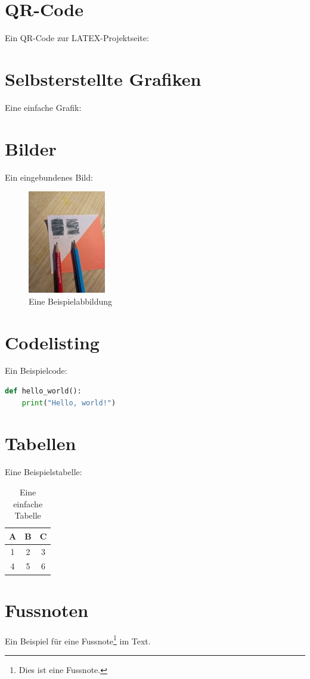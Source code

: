 \documentclass[a4paper,12pt]{article}
\begin{document}
\section{QR-Code}
Ein QR-Code zur LATEX-Projektseite:

\section{Selbsterstellte Grafiken}
Eine einfache Grafik:

\section{Bilder}
Ein eingebundenes Bild:
\begin{figure}[h!]
\centering
\includegraphics{Bild1}
\caption{Eine Beispielabbildung}
\label{fig:beispiel}
\end{figure}

\section{Codelisting}
Ein Beispielcode:
\begin{lstlisting}[language=Python, caption={Beispielcode in Python}]
def hello_world():
    print("Hello, world!")
\end{lstlisting}

\section{Tabellen}
\label{sec:tabellen}
Eine Beispielstabelle:
\begin{table}[h!]
\centering
\begin{tabular}{|c|c|c|}
\hline
A & B & C \\
\hline
1 & 2 & 3 \\
\hline
4 & 5 & 6 \\
\hline
\end{tabular}
\caption{Eine einfache Tabelle}
\end{table}

\section{Fussnoten}
Ein Beispiel für eine Fussnote\footnote{Dies ist eine Fussnote.} im Text.

\newpage



\newpage
\printindex
\end{document}
